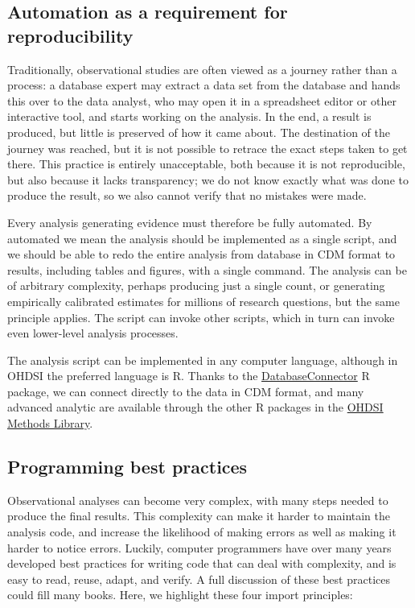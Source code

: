 \documentclass[11pt]{book}
\theoremstyle{definition}
\theoremstyle{definition}
\theoremstyle{definition}
\theoremstyle{remark}
\begin{document}
\hypertarget{automation}{%
\subsection{Automation as a requirement for reproducibility}\label{automation}}

Traditionally, observational studies are often viewed as a journey rather than a process: a database expert may extract a data set from the database and hands this over to the data analyst, who may open it in a spreadsheet editor or other interactive tool, and starts working on the analysis. In the end, a result is produced, but little is preserved of how it came about. The destination of the journey was reached, but it is not possible to retrace the exact steps taken to get there. This practice is entirely unacceptable, both because it is not reproducible, but also because it lacks transparency; we do not know exactly what was done to produce the result, so we also cannot verify that no mistakes were made.

Every analysis generating evidence must therefore be fully automated. By automated we mean the analysis should be implemented as a single script, and we should be able to redo the entire analysis from database in CDM format to results, including tables and figures, with a single command. The analysis can be of arbitrary complexity, perhaps producing just a single count, or generating empirically calibrated estimates for millions of research questions, but the same principle applies. The script can invoke other scripts, which in turn can invoke even lower-level analysis processes.

The analysis script can be implemented in any computer language, although in OHDSI the preferred language is R. Thanks to the \href{https://ohdsi.github.io/DatabaseConnector/}{DatabaseConnector} R package, we can connect directly to the data in CDM format, and many advanced analytic are available through the other R packages in the \href{https://ohdsi.github.io/MethodsLibrary/}{OHDSI Methods Library}.

\hypertarget{programming-best-practices}{%
\subsection{Programming best practices}\label{programming-best-practices}}

Observational analyses can become very complex, with many steps needed to produce the final results. This complexity can make it harder to maintain the analysis code, and increase the likelihood of making errors as well as making it harder to notice errors. Luckily, computer programmers have over many years developed best practices for writing code that can deal with complexity, and is easy to read, reuse, adapt, and verify. \citep{Martin_2008} A full discussion of these best practices could fill many books. Here, we highlight these four import principles:
\end{document}
